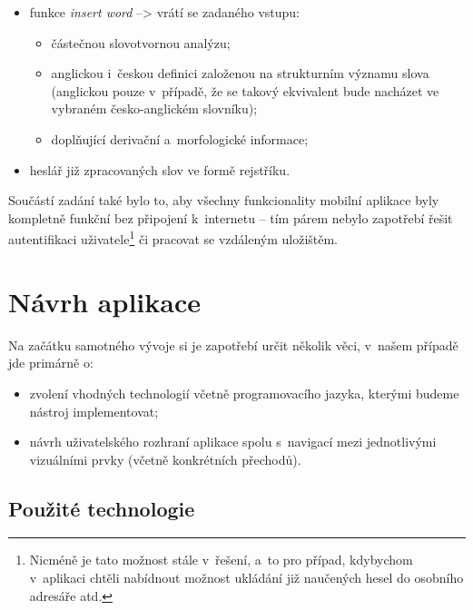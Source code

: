 \begin{itemize}
\tightlist
\item
  funkce \emph{insert word} --\textgreater{} vrátí se zadaného vstupu:

  \begin{itemize}
  \tightlist
  \item
    částečnou slovotvornou analýzu;
  \item
    anglickou i~českou definici založenou na strukturním významu slova
    (anglickou pouze v~případě, že se takový ekvivalent bude nacházet ve
    vybraném česko-anglickém slovníku);
  \item
    doplňující derivační a~morfologické informace;
  \end{itemize}
\item
  heslář již zpracovaných slov ve formě rejstříku.
\end{itemize}

Součástí zadání také bylo to, aby všechny funkcionality mobilní aplikace
byly kompletně funkční bez připojení k~internetu -- tím párem nebylo
zapotřebí řešit autentifikaci
uživatele\footnote{Nicméně je tato možnost stále v~řešení, a~to pro případ, kdybychom v~aplikaci chtěli nabídnout možnost ukládání již naučených hesel do osobního adresáře atd.}
či pracovat se vzdáleným uložištěm.

\hypertarget{nuxe1vrh-aplikace}{%
\section{Návrh aplikace}\label{nuxe1vrh-aplikace}}

Na začátku samotného vývoje si je zapotřebí určit několik věci, v~našem
případě jde primárně o:

\begin{itemize}
\tightlist
\item
  zvolení vhodných technologií včetně programovacího jazyka, kterými
  budeme nástroj implementovat;
\item
  návrh uživatelského rozhraní aplikace spolu s~navigací mezi
  jednotlivými vizuálními prvky (včetně konkrétních přechodů).
\end{itemize}

\hypertarget{pouux17eituxe9-technologie}{%
\subsection{Použité technologie}\label{pouux17eituxe9-technologie}}


